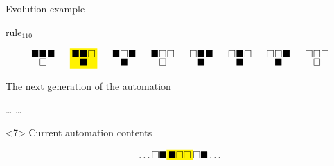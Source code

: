 \documentclass[presentation,aspectratio=169,smaller]{beamer}
\begin{document}
\begin{frame}[label={sec:org812e2ea},t]{Evolution example}
\begin{onlyenv}
\(\text{rule}_{110}\)

\begin{equation*}
  \begingroup
  \setlength\arraycolsep{0.25pt}
  \renewcommand{\arraystretch}{0.5}
  \begin{matrix}
    \blacksquare & \blacksquare & \blacksquare \\
    & \square &
  \end{matrix}\mspace{28mu}
  \mathcolorbox{yellow}{
    \begin{matrix}
      \blacksquare & \blacksquare & \square \\
      & \blacksquare &
    \end{matrix}
  }\mspace{28mu}
  \begin{matrix}
    \blacksquare & \square & \blacksquare \\
    & \blacksquare &
  \end{matrix}\mspace{28mu}
  \begin{matrix}
    \blacksquare & \square & \square \\
    & \square &
  \end{matrix}\mspace{28mu}
  \begin{matrix}
    \square & \blacksquare & \blacksquare \\
    & \blacksquare &
  \end{matrix}\mspace{28mu}
  \begin{matrix}
    \square & \blacksquare & \square \\
    & \blacksquare &
  \end{matrix}\mspace{28mu}
  \begin{matrix}
    \square & \square & \blacksquare \\
    & \blacksquare &
  \end{matrix}\mspace{28mu}
  \begin{matrix}
    \square & \square & \square \\
    & \square &
  \end{matrix}
  \endgroup
\end{equation*}

The next generation of the automation

\hfill \dots
\blacksquare
\blacksquare
{}
\mspace{14mu}
\mspace{14mu}
\mspace{14mu}
\dots \hfill
\end{onlyenv}

\begin{onlyenv}<7>
Current automation contents

\begin{equation*}
  \hfill
  \dots
  \square
  \blacksquare
  \mathcolorbox{yellow}{
    \blacksquare
    \square
    \square
  }
  \square
  \blacksquare
  \dots
  \hfill
\end{equation*}


\end{onlyenv}
\end{frame}
\end{document}
